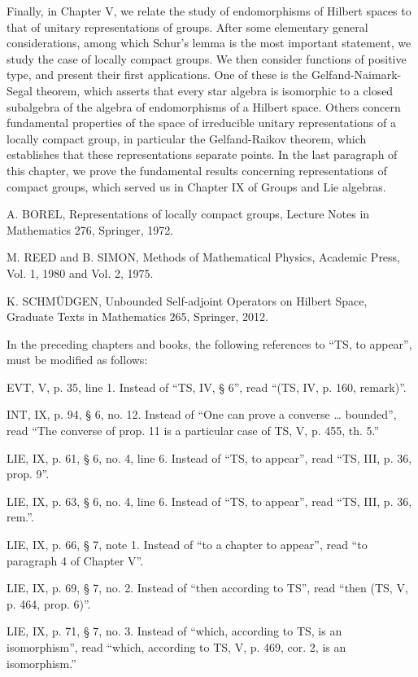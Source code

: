 Finally, in Chapter V, we relate the study of endomorphisms of Hilbert spaces to that of unitary representations of groups. After some elementary general considerations, among which Schur's lemma is the most important statement, we study the case of locally compact groups. We then consider functions of positive type, and present their first applications. One of these is the Gelfand-Naimark-Segal theorem, which asserts that every star algebra is isomorphic to a closed subalgebra of the algebra of endomorphisms of a Hilbert space. Others concern fundamental properties of the space of irreducible unitary representations of a locally compact group, in particular the Gelfand-Raikov theorem, which establishes that these representations separate points. In the last paragraph of this chapter, we prove the fundamental results concerning representations of compact groups, which served us in Chapter IX of Groups and Lie algebras.

A. BOREL, Representations of locally compact groups, Lecture Notes in Mathematics 276, Springer, 1972.

M. REED and B. SIMON, Methods of Mathematical Physics, Academic Press, Vol. 1, 1980 and Vol. 2, 1975.

K. SCHMÜDGEN, Unbounded Self-adjoint Operators on Hilbert Space, Graduate Texts in Mathematics 265, Springer, 2012.

In the preceding chapters and books, the following references to “TS, to appear”, must be modified as follows:

EVT, V, p. 35, line 1. Instead of “TS, IV, § 6”, read “(TS, IV, p. 160, remark)”.

INT, IX, p. 94, § 6, no. 12. Instead of “One can prove a converse \ldots{} bounded”, read “The converse of prop. 11 is a particular case of TS, V, p. 455, th. 5.”

LIE, IX, p. 61, § 6, no. 4, line 6. Instead of “TS, to appear”, read “TS, III, p. 36, prop. 9”.

LIE, IX, p. 63, § 6, no. 4, line 6. Instead of “TS, to appear”, read “TS, III, p. 36, rem.”.

LIE, IX, p. 66, § 7, note 1. Instead of “to a chapter to appear”, read “to paragraph 4 of Chapter V”.

LIE, IX, p. 69, § 7, no. 2. Instead of “then according to TS”, read “then (TS, V, p. 464, prop. 6)”.

LIE, IX, p. 71, § 7, no. 3. Instead of “which, according to TS, is an isomorphism”, read “which, according to TS, V, p. 469, cor. 2, is an isomorphism.”

